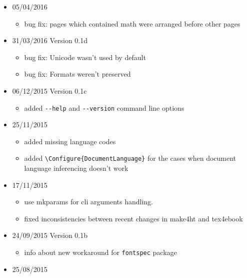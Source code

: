 \begin{itemize}
  \begin{itemize}
  \tightlist
  \item
    Cut \texttt{\textbackslash{}part} commands to standalone pages
  \end{itemize}
\item
  05/04/2016

  \begin{itemize}
  \tightlist
  \item
    bug fix: pages which contained math were arranged before other pages
  \end{itemize}
\item
  31/03/2016 Version 0.1d

  \begin{itemize}
  \tightlist
  \item
    bug fix: Unicode wasn't used by default
  \item
    bug fix: Formats weren't preserved
  \end{itemize}
\item
  06/12/2015 Version 0.1c

  \begin{itemize}
  \tightlist
  \item
    added \texttt{-\/-help} and \texttt{-\/-version} command line
    options
  \end{itemize}
\item
  25/11/2015

  \begin{itemize}
  \tightlist
  \item
    added missing language codes
  \item
    added \texttt{\textbackslash{}Configure\{DocumentLanguage\}} for the
    cases when document language inferencing doesn't work
  \end{itemize}
\item
  17/11/2015

  \begin{itemize}
  \tightlist
  \item
    use mkparams for cli arguments handling.
  \item
    fixed inconsistencies between recent changes in make4ht and
    tex4ebook
  \end{itemize}
\item
  24/09/2015 Version 0.1b

  \begin{itemize}
  \tightlist
  \item
    info about new workaround for \texttt{fontspec} package
  \end{itemize}
\item
  25/08/2015


\end{itemize}
